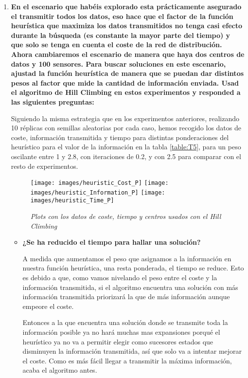 \documentclass{article}
\begin{document}
\begin{enumerate}
  \item \textbf{En el escenario que habéis explorado esta prácticamente asegurado el transmitir todos los datos, eso hace que el factor de la función heurística que maximiza los datos transmitidos no tenga casi efecto durante la búsqueda (es constante la mayor parte del tiempo) y que solo se tenga en cuenta el coste de la red de distribución. Ahora cambiaremos el escenario de manera que haya dos centros de datos y 100 sensores. Para buscar soluciones en este escenario, ajustad la función heurística de manera que se puedan dar distintos pesos al factor que mide la cantidad de información enviada. Usad el algoritmo de Hill Climbing en estos experimentos y responded a las siguientes preguntas:}

  Siguiendo la misma estrategia que en los experimentos anteriores, realizando 10 réplicas con semillas aleatorias por cada caso, hemos recogido los datos de coste, información transmitida y tiempo para distintas ponderaciones del heurístico para el valor de la información en la tabla \ref{table:T5}, para un peso oscilante entre 1 y 2.8, con iteraciones de 0.2, y con 2.5 para comparar con el resto de experimentos.
  \begin{figure}[ht]
    \centering
    \texttt{[image: images/heuristic\_Cost\_P]}\hfill
    \texttt{[image: images/heuristic\_Information\_P]}\hfill
    \texttt{[image: images/heuristic\_Time\_P]}
    \caption{\textit{Plots con los datos de coste, tiempo y centros usados con el \textit{Hill Climbing}}}
    \label{fig:HP}
  \end{figure}
  \begin{itemize}
    \item \textbf{¿Se ha reducido el tiempo para hallar una solución?}\par
    A medida que aumentamos el peso que asignamos a la información en nuestra función heurística, una resta ponderada, el tiempo se reduce. Esto es debido a que, como vamos nivelando el peso entre el coste y la información transmitida, si el algoritmo encuentra una solución con más información transmitida priorizará la que de más información aunque empeore el coste.\par
    Entonces a la que encuentra una solución donde se transmite toda la información posible ya no hará muchas mas expansiones porqué el heurístico ya no va a permitir elegir como sucesores estados que disminuyen la información transmitida, así que solo va a intentar mejorar el coste. Como es más fácil llegar a transmitir la máxima información, acaba el algoritmo antes.

\end{itemize}
\end{enumerate}
\end{document}
